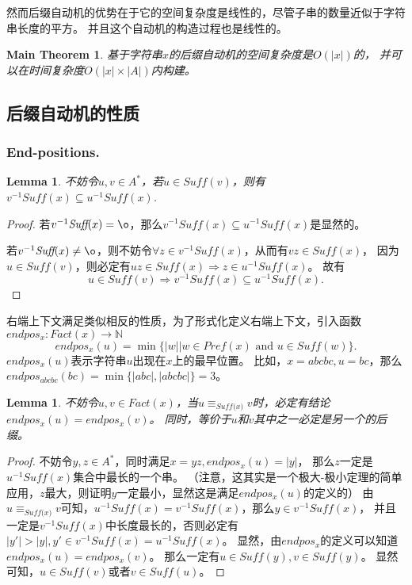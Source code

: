 \documentclass[UTF8]{ctexart}
\newtheorem{lem}[thm]{Lemma}
\newtheorem{mthm}[thm]{Main Theorem}
\theoremstyle{definition}
\theoremstyle{remark}
\numberwithin{equation}{subsection}
\newcommand{\equsuf}[1][x]{\equiv_{\textit{Suff(#1)}}}
\newcommand{\Suff}{\textit{Suff}}
\begin{document}
	然而后缀自动机的优势在于它的空间复杂度是线性的，尽管子串的数量近似于字符串长度的平方。
	并且这个自动机的构造过程也是线性的。
	
	\begin{mthm}
		基于字符串$x$的后缀自动机的空间复杂度是$O(|x|)$的，
		并可以在时间复杂度$O(|x| \times |A|)$内构建。
	\end{mthm}
	
\subsection{后缀自动机的性质}
\label{sub:sam_property}

\subsubsection{End-positions.}
	
	\begin{lem}
	\label{lem:u_in_sufv}
		不妨令$u,v \in A^*$，若$u \in \Suff(v)$，则有$v^{-1} \Suff(x) \subseteq u^{-1} \Suff(x)$.
	\end{lem}
	\begin{proof}
		若$v^{-1} \Suff(x) = {\o}$，那么$v^{-1} \Suff(x) \subseteq u^{-1} \Suff(x)$是显然的。
		
		若$v^{-1} \Suff(x) \neq {\o}$，则不妨令$\forall z \in v^{-1} \Suff(x)$，从而有$vz \in \Suff(x)$，
		因为$u \in \Suff(v)$，则必定有$uz \in \Suff(x) \Rightarrow z \in u^{-1} \Suff(x)$。
		故有
		\[
			u \in \Suff(v) \Rightarrow v^{-1} \Suff(x) \subseteq u^{-1} \Suff(x).
		\]
	\end{proof}
	
	右端上下文满足类似相反的性质，为了形式化定义右端上下文，引入函数$endpos_x: Fact(x) \rightarrow \mathbb{N}$
	\[
		endpos_x(u) = \min \{ |w| | w \in Pref(x) \text{ and } u \in \Suff(w) \}.
	\]
	$endpos_x(u)$表示字符串$u$出现在$x$上的最早位置。
	比如，$x = abcbc, u=bc$，那么$endpos_{abcbc}(bc) = \min \{ |abc|, |abcbc| \} = 3$。
	
	\begin{lem}
	\label{lem:u_equsuf_v}
		不妨令$u,v \in Fact(x)$，当$u \equsuf v$时，必定有结论$endpos_x(u) = endpos_x(v)$。
		同时，等价于$u$和$v$其中之一必定是另一个的后缀。
	\end{lem}
	\begin{proof}
		不妨令$y,z \in A^*$，同时满足$x = yz, endpos_x(u) = |y|$，
		那么$z$一定是$u^{-1} \Suff(x)$集合中最长的一个串。
		（注意，这其实是一个极大-极小定理的简单应用，$z$最大，则证明$y$一定最小，显然这是满足$endpos_x(u)$的定义的）
		由$u \equsuf v$可知，$u^{-1} \Suff(x) = v^{-1} \Suff(x)$，那么$y \in v^{-1} \Suff(x)$，
		并且一定是$v^{-1} \Suff(x)$中长度最长的，否则必定有$|y'| > |y|, y' \in v^{-1} \Suff(x) = u^{-1} \Suff(x)$。
		显然，由$endpos_x$的定义可以知道$endpos_x(u) = endpos_x(v)$。
		那么一定有$u \in \Suff(y), v \in \Suff(y)$。
		显然可知，$u \in \Suff(v)$或者$v \in \Suff(u)$。
	\end{proof}
	
\end{document}
